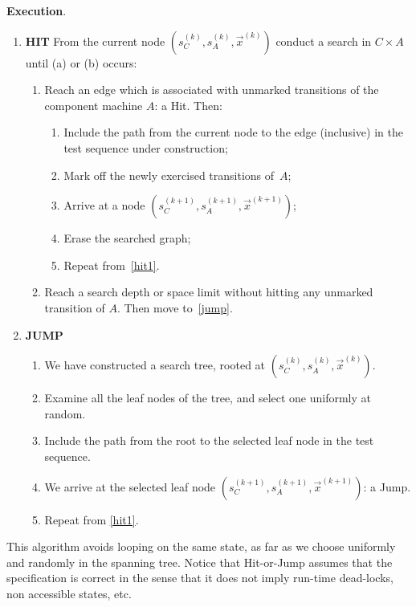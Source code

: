\noindent
{\bf Execution}.
\begin{enumerate}
\item {\bf HIT}\label{hit1}
From the current node $(s_C^{(k)},s_A^{(k)},\vec{x}^{(k)})$
conduct a search in $C\times A$ until (a) or (b) occurs:
\begin{enumerate}
\item \label{a} Reach an edge which is associated with unmarked transitions
of the component machine $A$: a Hit.\label{search}
Then: 
\begin{enumerate}
	\item Include the path from the current node to the edge (inclusive) in the test sequence under construction;
	\item Mark off the newly exercised transitions of~$A$;
	\item Arrive at a node $(s_C^{(k+1)},s_A^{(k+1)},\vec{x}^{(k+1)})$;
	\item Erase the searched graph;
	\item Repeat from~\ref{hit1}.
\end{enumerate}

\item \label{b} Reach a search depth or space limit without hitting any unmarked
transition of $A$. Then move to~\ref{jump}. 
\end{enumerate}
\item {\bf JUMP} \label{jump}
\begin{enumerate}
\item We have constructed a search tree, rooted at 
$(s_C^{(k)},s_A^{(k)},\vec{x}^{(k)})$.
\item Examine all the leaf nodes of the tree, 
and select one uniformly at random.
\item Include the path from the root to the selected leaf node in the test
sequence.
\item We arrive at the selected leaf node
$(s_C^{(k+1)},s_A^{(k+1)},\vec{x}^{(k+1)})$: a Jump.
\item Repeat from \ref{hit1}.
\end{enumerate}
\end{enumerate}

This algorithm avoids looping on the same state, as far as we choose
uniformly and randomly in the spanning tree. Notice that Hit-or-Jump
assumes that the specification is correct in the sense that it does
not imply run-time dead-locks, non accessible states, etc.

